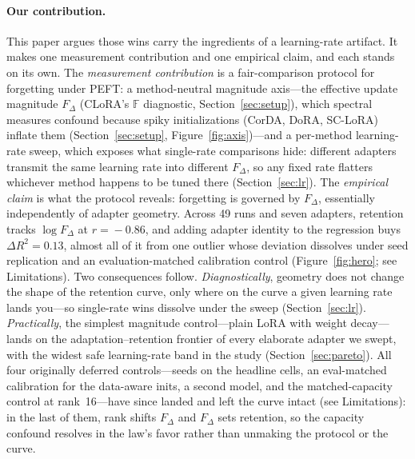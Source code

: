 \documentclass[11pt]{article}
\newcommand{\dw}{F_{\Delta}}
\begin{document}
\paragraph{Our contribution.} This paper argues those wins carry the ingredients
of a learning-rate artifact. It makes one measurement contribution and one
empirical claim, and each stands on its own. The \emph{measurement contribution}
is a fair-comparison protocol for forgetting under PEFT: a method-neutral
magnitude axis---the effective update magnitude $\dw$ (CLoRA's $\mathbb{F}$
diagnostic, Section~\ref{sec:setup}), which spectral measures
confound because spiky initializations (CorDA, DoRA, SC-LoRA) inflate them
(Section~\ref{sec:setup}, Figure~\ref{fig:axis})---and a per-method learning-rate
sweep, which exposes what single-rate comparisons hide: different adapters
transmit the same learning rate into different $\dw$, so any fixed rate flatters
whichever method happens to be tuned there (Section~\ref{sec:lr}). The
\emph{empirical claim} is what the protocol reveals: forgetting is governed by
$\dw$, essentially independently of adapter geometry. Across 49 runs and seven
adapters, retention tracks $\log\dw$ at $r\!=\!-0.86$, and adding adapter identity
to the regression buys $\Delta R^2\!=\!0.13$, almost all of it from one outlier
whose deviation dissolves under seed replication and an evaluation-matched
calibration control (Figure~\ref{fig:hero}; see Limitations). Two
consequences follow.
\emph{Diagnostically}, geometry does not change the shape of the retention curve,
only where on the curve a given learning rate lands you---so single-rate wins
dissolve under the sweep (Section~\ref{sec:lr}). \emph{Practically}, the simplest
magnitude control---plain LoRA with weight decay---lands on the
adaptation--retention frontier of every elaborate adapter we swept, with the
widest safe learning-rate band in the study (Section~\ref{sec:pareto}). All four
originally deferred controls---seeds on the headline cells, an eval-matched
calibration for the data-aware inits, a second model, and the matched-capacity
control at rank~16---have since landed and left the curve intact (see
Limitations): in the last of them, rank shifts $\dw$ and $\dw$ sets retention,
so the capacity confound resolves in the law's favor rather than unmaking the
protocol or the curve.
\end{document}
